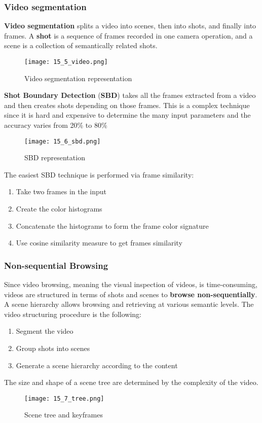 \documentclass{article}
\begin{document}
\subsubsection{Video segmentation}
\textbf{Video segmentation} splits a video into scenes, then into shots, and finally into frames. A \textbf{shot} is a sequence of frames recorded in one camera operation, and a scene is a collection of semantically related shots.
\begin{figure}[H]
    \centering
    \texttt{[image: 15\_5\_video.png]}
    \caption{Video segmentation representation}
\end{figure}
\textbf{Shot Boundary Detection} (\textbf{SBD}) takes all the frames extracted from a video and then creates shots depending on those frames. This is a complex technique since it is hard and expensive to determine the many input parameters and the accuracy varies from 20\% to 80\%
\begin{figure}[H]
    \centering
    \texttt{[image: 15\_6\_sbd.png]}
    \caption{SBD representation}
\end{figure}
The easiest SBD technique is performed via frame similarity:
\begin{enumerate}
    \item Take two frames in the input
    \item Create the color histograms
    \item Concatenate the histograms to form the frame color signature
    \item Use cosine similarity measure to get frames similarity
\end{enumerate}

\subsubsection{Non-sequential Browsing}
Since video browsing, meaning the visual inspection of videos, is time-consuming, videos are structured in terms of shots and scenes to \textbf{browse non-sequentially}. A scene hierarchy allows browsing and retrieving at various semantic levels. The video structuring procedure is the following:
\begin{enumerate}
    \item Segment the video
    \item Group shots into scenes
    \item Generate a scene hierarchy according to the content
\end{enumerate}
The size and shape of a scene tree are determined by the complexity of the video.
\begin{figure}[H]
    \centering
    \texttt{[image: 15\_7\_tree.png]}
    \caption{Scene tree and keyframes}
\end{figure}
\end{document}
